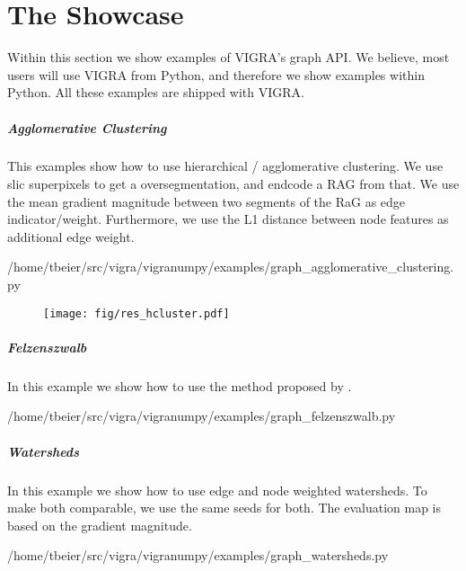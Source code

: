 \flushleft
\chapter{The Showcase}\label{ch:the_showcase} 

Within this section we show examples of VIGRA's
graph API. We believe, most users will use
VIGRA from Python, and therefore we show examples
within Python.
All these examples are shipped with  VIGRA.


\newpage
\paragraph{Agglomerative Clustering}
This examples show how to use  hierarchical /  agglomerative clustering.
We use slic superpixels \citep{achanta_2012_pami}
to get a oversegmentation, and endcode a RAG from that.
We use the mean gradient magnitude between two segments 
of the RaG
as edge indicator/weight.
Furthermore, we use the L1 distance between node features
as additional edge weight.




{/home/tbeier/src/vigra/vigranumpy/examples/graph_agglomerative_clustering.py}
\begin{figure}
\centering
\texttt{[image: fig/res\_hcluster.pdf]}
\end{figure}


%

\paragraph{Felzenszwalb}
In this example we show how to use the method 
proposed by \citet{felzenszwalb_2004_ijcv}.

{/home/tbeier/src/vigra/vigranumpy/examples/graph_felzenszwalb.py}

\paragraph{Watersheds}
In this example we show how to use edge and node weighted
watersheds.
To make both comparable, we use the same seeds for both.
The evaluation map is based on the gradient magnitude.


{/home/tbeier/src/vigra/vigranumpy/examples/graph_watersheds.py}